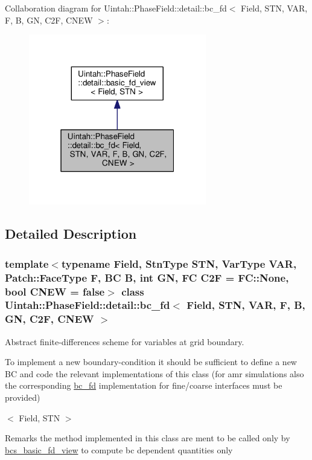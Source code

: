 Collaboration diagram for Uintah\+:\+:Phase\+Field\+:\+:detail\+:\+:bc\+\_\+fd$<$ Field, S\+TN, V\+AR, F, B, GN, C2F, C\+N\+EW $>$\+:\nopagebreak
\begin{figure}[H]
\begin{center}
\leavevmode
\includegraphics[width=220pt]{classUintah_1_1PhaseField_1_1detail_1_1bc__fd__coll__graph}
\end{center}
\end{figure}


\subsection{Detailed Description}
\subsubsection*{template$<$typename Field, Stn\+Type S\+TN, Var\+Type V\+AR, Patch\+::\+Face\+Type F, BC B, int GN, FC C2F = F\+C\+::\+None, bool C\+N\+EW = false$>$\newline
class Uintah\+::\+Phase\+Field\+::detail\+::bc\+\_\+fd$<$ Field, S\+T\+N, V\+A\+R, F, B, G\+N, C2\+F, C\+N\+E\+W $>$}

Abstract finite-\/differences scheme for variables at grid boundary. 

To implement a new boundary-\/condition it should be sufficient to define a new BC and code the relevant implementations of this class (for amr simulations also the corresponding \hyperlink{classUintah_1_1PhaseField_1_1detail_1_1bc__fd}{bc\+\_\+fd} implementation for fine/coarse interfaces must be provided)

$<$ Field, S\+TN $>$

\begin{DoxyRemark}{Remarks}
the method implemented in this class are ment to be called only by \hyperlink{classUintah_1_1PhaseField_1_1detail_1_1bcs__basic__fd__view}{bcs\+\_\+basic\+\_\+fd\+\_\+view} to compute bc dependent quantities only
\end{DoxyRemark}

